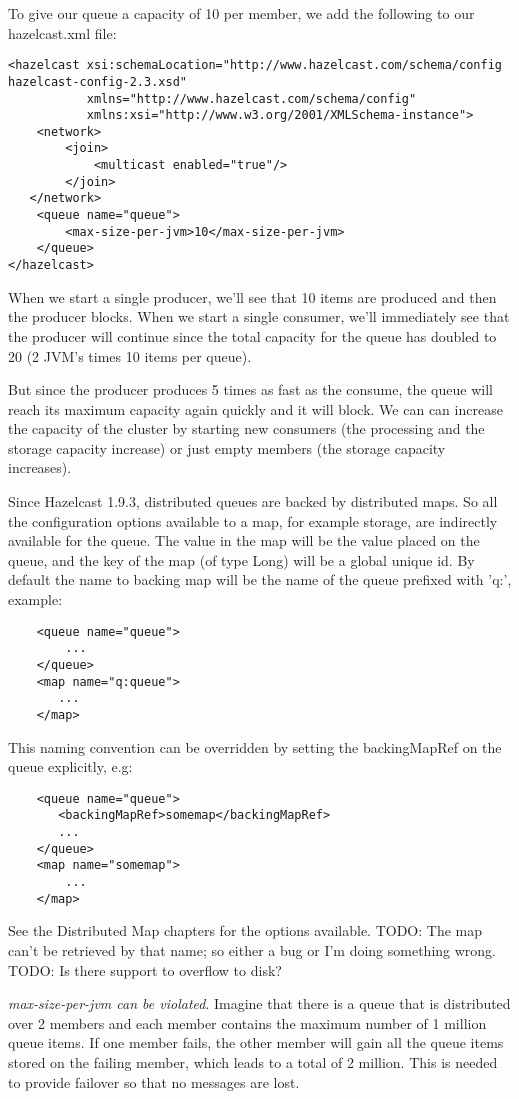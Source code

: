 To give our queue a capacity of 10 per member, we add the following to our hazelcast.xml file:
\begin{verbatim}
<hazelcast xsi:schemaLocation="http://www.hazelcast.com/schema/config hazelcast-config-2.3.xsd"
           xmlns="http://www.hazelcast.com/schema/config"
           xmlns:xsi="http://www.w3.org/2001/XMLSchema-instance">
    <network>
        <join>
            <multicast enabled="true"/>
        </join>
   </network>
    <queue name="queue">
        <max-size-per-jvm>10</max-size-per-jvm>
    </queue>
</hazelcast>
\end{verbatim}
When we start a single producer, we'll see that 10 items are produced and then the producer blocks. When we start a single consumer, we'll immediately see that the producer will continue since the total capacity for the queue has doubled to 20 (2 JVM's times 10 items per queue). 

But since the producer produces 5 times as fast as the consume, the queue will reach its maximum capacity again quickly and it will block. We can can increase the capacity of the cluster by starting new consumers (the processing and the storage capacity increase) or just empty members (the storage capacity increases).

Since Hazelcast 1.9.3, distributed queues are backed by distributed maps. So all the configuration options available to a map, for example storage, are indirectly available for the queue. The value in the map will be the value placed on the queue, and the key of the map (of type Long) will be a global unique id. By default the name to backing map will be the name of the queue prefixed with 'q:', example:
\begin{verbatim}
    <queue name="queue">
        ...
    </queue>
    <map name="q:queue">
       ...
    </map>
\end{verbatim}

This naming convention can be overridden by setting the backingMapRef on the queue explicitly, e.g:
\begin{verbatim}
    <queue name="queue">
       <backingMapRef>somemap</backingMapRef>
       ... 
    </queue>
    <map name="somemap">
        ...
    </map>
\end{verbatim}
See the Distributed Map chapters for the options available.
TODO: The map can't be retrieved by that name; so either a bug or I'm doing something wrong.
TODO: Is there support to overflow to disk?

\emph{max-size-per-jvm can be violated}. Imagine that there is a queue that is distributed over 2 members and each member contains the maximum number of 1 million queue items. If one member fails, the other member will gain all the queue items stored on the failing member, which leads to a total of 2 million. This is needed to provide failover so that no messages are lost. 

